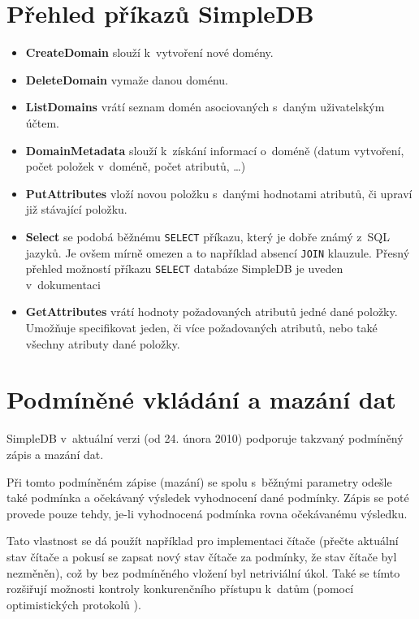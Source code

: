 \documentclass[oneside,12pt]{fithesis2}
\begin{document}
\label{komunikace}
\section{Přehled příkazů SimpleDB}
\begin{itemize}
 \item \textbf{CreateDomain} slouží k~vytvoření nové domény.
 \item \textbf{DeleteDomain} vymaže danou doménu.
 \item \textbf{ListDomains} vrátí seznam domén asociovaných s~daným uživatelským účtem.
 \item \textbf{DomainMetadata} slouží k~získání informací o~doméně (datum vytvoření, počet položek v~doméně, počet atributů, \dots)
 \item \textbf{PutAttributes} vloží novou položku s~danými hodnotami atributů, či upraví již stávající položku.
 \item \textbf{Select} se podobá běžnému \verb<SELECT< příkazu, který je dobře známý z~SQL jazyků. Je ovšem mírně omezen a to například absencí \verb<JOIN< klauzule. Přesný přehled možností příkazu \verb<SELECT< databáze SimpleDB je uveden v~dokumentaci\cite[strana 37, Using Select to Create Amazon SimpleDB Queries]{simpledbDeveloper}
 \item \textbf{GetAttributes} vrátí hodnoty požadovaných atributů jedné dané položky. Umožňuje specifikovat jeden, či více požadovaných atributů, nebo také všechny atributy dané položky.
\end{itemize}

\section{Podmíněné vkládání a mazání dat}
SimpleDB v~aktuální verzi (od 24. února 2010) podporuje takzvaný podmíněný zápis a mazání dat. 

Při tomto podmíněném zápise (mazání) se spolu s~běžnými parametry odešle také podmínka a očekávaný výsledek vyhodnocení dané podmínky. Zápis se poté provede pouze tehdy, je-li vyhodnocená podmínka rovna očekávanému výsledku.

Tato vlastnost se dá použít například pro implementaci čítače (přečte aktuální stav čítače a pokusí se zapsat nový stav čítače za podmínky, že stav čítače byl nezměněn), což by bez podmíněného vložení byl netriviální úkol. Také se tímto rozšiřují možnosti kontroly konkurenčního přístupu k~datům (pomocí optimistických protokolů ).
\end{document}
